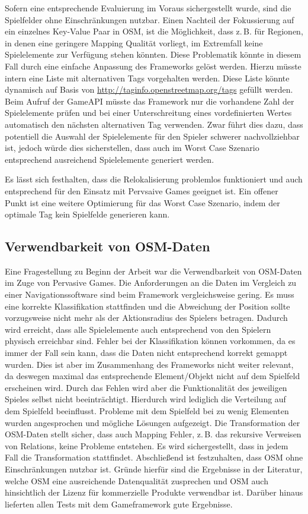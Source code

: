 Sofern eine entsprechende Evaluierung im Voraus sichergestellt wurde, sind die Spielfelder ohne Einschränkungen nutzbar.
Einen Nachteil der Fokussierung auf ein einzelnes Key-Value Paar in OSM, ist die Möglichkeit, dass z.\,B. für Regionen, in denen eine geringere Mapping Qualität vorliegt, im Extremfall keine Spielelemente zur Verfügung stehen könnten. Diese Problematik könnte in diesem Fall durch eine einfache Anpassung des Frameworks gelöst werden. Hierzu müsste intern eine Liste mit alternativen Tags vorgehalten werden. Diese Liste könnte dynamisch auf Basis von \url{http://taginfo.openstreetmap.org/tags} gefüllt werden. Beim Aufruf der GameAPI müsste das Framework nur die vorhandene Zahl der Spielelemente prüfen und bei einer Unterschreitung eines vordefinierten Wertes automatisch den nächsten alternativen Tag verwenden. Zwar führt dies dazu, dass potentiell die Auswahl der Spielelemente für den Spieler schwerer nachvollziehbar ist, jedoch würde dies sicherstellen, dass auch im Worst Case Szenario entsprechend ausreichend Spielelemente generiert werden.

Es lässt sich festhalten, dass die Relokalisierung problemlos funktioniert und auch entsprechend für den Einsatz mit Pervsaive Games geeignet ist. Ein offener Punkt ist eine weitere Optimierung für das Worst Case Szenario, indem der optimale Tag kein Spielfelde generieren kann.

\subsection*{Verwendbarkeit von OSM-Daten}

Eine Fragestellung zu Beginn der Arbeit war die Verwendbarkeit von OSM-Daten im Zuge von Pervasive Games.
Die Anforderungen an die Daten im Vergleich zu einer Navigationssoftware sind beim Framework vergleichsweise gering.
Es muss eine korrekte Klassifikation stattfinden und die Abweichung der Position sollte vorzugsweise nicht mehr als der Aktionsradius des Spielers betragen. Dadurch wird erreicht, dass alle Spielelemente auch entsprechend von den Spielern physisch erreichbar sind.
Fehler bei der Klassifikation können vorkommen, da es immer der Fall sein kann, dass die Daten nicht entsprechend korrekt gemappt wurden.
Dies ist aber im Zusammenhang des Frameworks nicht weiter relevant, da deswegen maximal das entsprechende Element/Objekt nicht auf dem Spielfeld erscheinen wird. Durch das Fehlen wird aber die Funktionalität des jeweiligen Spieles selbst nicht beeinträchtigt. Hierdurch wird lediglich die Verteilung auf dem Spielfeld beeinflusst. Probleme mit dem Spielfeld bei zu wenig Elementen wurden angesprochen und mögliche Lösungen aufgezeigt.
Die Transformation der OSM-Daten stellt sicher, dass auch Mapping Fehler, z.\,B. das rekursive Verweisen von Relations, keine Probleme entstehen. Es wird sichergestellt, dass in jedem Fall die Transformation stattfindet.
Abschließend ist festzuhalten, dass OSM ohne Einschränkungen nutzbar ist.
Gründe hierfür sind die Ergebnisse in der Literatur, welche OSM eine ausreichende Datenqualität zusprechen und OSM auch hinsichtlich der Lizenz für kommerzielle Produkte verwendbar ist. Darüber hinaus lieferten allen Tests mit dem Gameframework gute Ergebnisse. 

